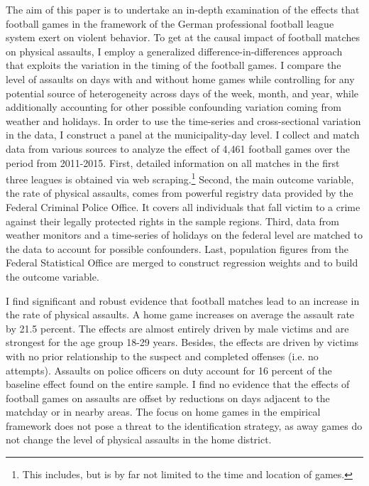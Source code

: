 The aim of this paper is to undertake an in-depth examination of the effects that football games in the framework of the German professional football league system exert on violent behavior. To get at the causal impact of football matches on physical assaults, I employ a generalized difference-in-differences approach that exploits the variation in the timing of the football games. I compare the level of assaults on days with and without home games while controlling for any potential source of heterogeneity across days of the week, month, and year, while additionally accounting for other possible confounding variation coming from weather and holidays. In order to use the time-series and cross-sectional variation in the data, I construct a panel at the municipality-day level. I collect and match data from various sources to analyze the effect of 4,461 football games over the period from 2011-2015. First, detailed information on all matches in the first three leagues is obtained via web scraping.\footnote{This includes, but is by far not limited to the time and location of games.} Second, the main outcome variable, the rate of physical assaults, comes from powerful registry data provided by the Federal Criminal Police Office. It covers all individuals that fall victim to a crime against their legally protected rights in the sample regions. Third, data from weather monitors and a time-series of holidays on the federal level are matched to the data to account for possible confounders. Last, population figures from the Federal Statistical Office are merged to construct regression weights and to build the outcome variable. 



I find significant and robust evidence that football matches lead to an increase in the rate of physical assaults. A home game increases on average the assault rate by 21.5 percent. The effects are almost entirely driven by male victims and are strongest for the age group 18-29 years. Besides, the effects are driven by victims with no prior relationship to the suspect and completed offenses (i.e. no attempts). Assaults on police officers on duty account for 16 percent of the baseline effect found on the entire sample. I find no evidence that the effects of football games on assaults are offset by reductions on days adjacent to the matchday or in nearby areas. The focus on home games in the empirical framework does not pose a threat to the identification strategy, as away games do not change the level of physical assaults in the home district.



